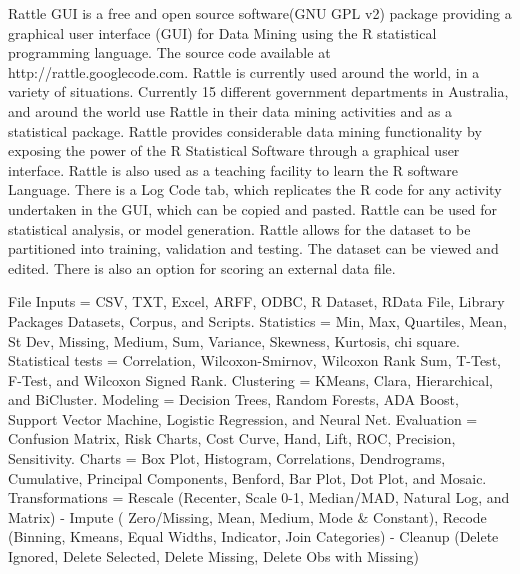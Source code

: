 

Rattle GUI is a free and open source software(GNU GPL v2) package providing a graphical user interface (GUI) for Data Mining using the R statistical programming language. The source code available at http://rattle.googlecode.com. Rattle is currently used around the world, in a variety of situations. Currently 15 different government departments in Australia, and around the world use Rattle in their data mining activities and as a statistical package.
Rattle provides considerable data mining functionality by exposing the power of the R Statistical Software through a graphical user interface. Rattle is also used as a teaching facility to learn the R software Language. There is a Log Code tab, which replicates the R code for any activity undertaken in the GUI, which can be copied and pasted. Rattle can be used for statistical analysis, or model generation. Rattle allows for the dataset to be partitioned into training, validation and testing. The dataset can be viewed and edited. There is also an option for scoring an external data file.

File Inputs = CSV, TXT, Excel, ARFF, ODBC, R Dataset, RData File, Library Packages Datasets, Corpus, and Scripts.
Statistics = Min, Max, Quartiles, Mean, St Dev, Missing, Medium, Sum, Variance, Skewness, Kurtosis, chi square.
Statistical tests = Correlation, Wilcoxon-Smirnov, Wilcoxon Rank Sum, T-Test, F-Test, and Wilcoxon Signed Rank.
Clustering = KMeans, Clara, Hierarchical, and BiCluster.
Modeling = Decision Trees, Random Forests, ADA Boost, Support Vector Machine, Logistic Regression, and Neural Net.
Evaluation = Confusion Matrix, Risk Charts, Cost Curve, Hand, Lift, ROC, Precision, Sensitivity.
Charts = Box Plot, Histogram, Correlations, Dendrograms, Cumulative, Principal Components, Benford, Bar Plot, Dot Plot, and Mosaic.
Transformations = Rescale (Recenter, Scale 0-1, Median/MAD, Natural Log, and Matrix) - Impute ( Zero/Missing, Mean, Medium, Mode & Constant), Recode (Binning, Kmeans, Equal Widths, Indicator, Join Categories) - Cleanup (Delete Ignored, Delete Selected, Delete Missing, Delete Obs with Missing)

